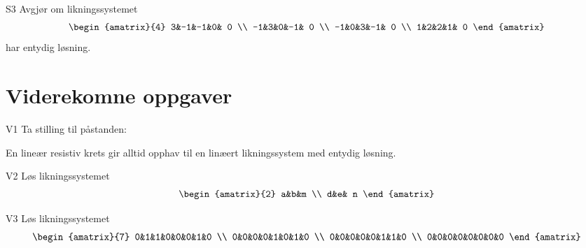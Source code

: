 \begin{oppgave}{S3}
Avgjør om likningssystemet
\[
\begin{amatrix}{4}
3&-1&-1&0& 0 \\
-1&3&0&-1& 0 \\
-1&0&3&-1& 0 \\
1&2&2&1& 0 
\end{amatrix}
\]
har entydig løsning.
\end{oppgave}

\section*{Viderekomne oppgaver}

\begin{oppgave}{V1}
Ta stilling til påstanden:
\begin{tcolorbox}
En lineær resistiv krets gir alltid opphav til en linæert likningssystem med entydig løsning.
\end{tcolorbox}
\end{oppgave}



\begin{oppgave}{V2}
Løs likningssystemet
\[
\begin{amatrix}{2}
a&b&m \\
d&e& n 
\end{amatrix}
\]
\end{oppgave}

\begin{oppgave}{V3}
Løs likningssystemet
\[
\begin{amatrix}{7}
0&1&1&0&0&0&1&0 \\
0&0&0&0&1&0&1&0 \\
0&0&0&0&0&1&1&0 \\
0&0&0&0&0&0&0&0 
\end{amatrix}
\]
\end{oppgave}



